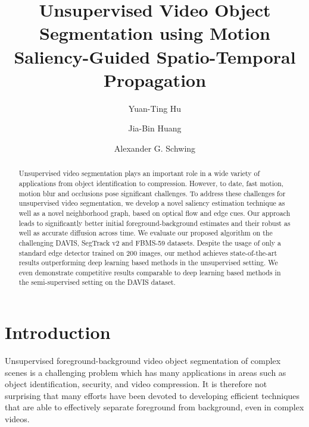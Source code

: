 \documentclass[runningheads]{llncs}
\newlength\secmargin
\begin{document}
\title{Unsupervised Video Object Segmentation using Motion Saliency-Guided Spatio-Temporal Propagation} 




\author{Yuan-Ting Hu \and
Jia-Bin Huang \and
Alexander G. Schwing}



\maketitle              \begin{abstract}

Unsupervised video segmentation plays an important role in a wide variety of applications from object identification to compression. However, to date, fast motion, motion blur and occlusions pose significant challenges. To address these challenges for unsupervised video segmentation, we develop a novel saliency estimation technique as well as a novel neighborhood graph, based on optical flow and edge cues. Our approach leads to significantly better initial foreground-background estimates and their robust as well as accurate diffusion across time. We  evaluate our proposed  algorithm on the challenging DAVIS, SegTrack v2 and FBMS-59 datasets. Despite the usage of only a standard edge detector trained on 200 images, our method achieves state-of-the-art results outperforming deep learning based methods in the unsupervised setting. We even demonstrate competitive results comparable to deep learning based methods in the semi-supervised setting on the DAVIS dataset.



\end{abstract} 
\vspace{\secmargin}
\section{Introduction}
\label{sec:intro}


Unsupervised foreground-background video object segmentation of complex scenes is a challenging problem which has many applications in areas such as object identification, security, and video compression. It is therefore not surprising that many efforts have been devoted to developing efficient techniques that are able to effectively separate foreground from background, even in complex videos.
\end{document}

